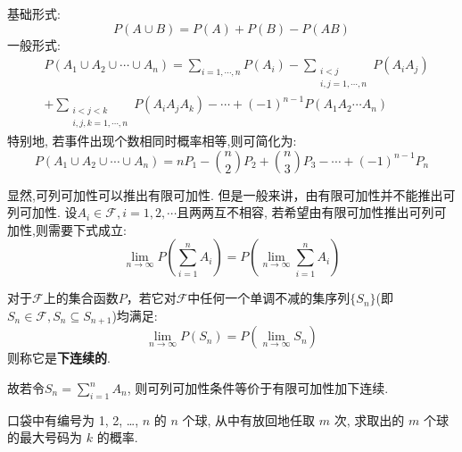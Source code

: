 \begin{corollary}[加法公式]
    基础形式:
    \[ P(A \cup B) = P(A) + P(B) - P(AB) \]
    一般形式:
    \begin{align*}
         & P\left(A_{1} \cup A_{2} \cup \cdots \cup A_{n}\right) =  \sum_{i=1, \cdots, n} P\left(A_{i}\right)-\sum_{\substack{i<j \\
        i, j=1, \cdots, n}} P\left(A_{i} A_{j}\right)                                                                             \\
         & +\sum_{\substack{i<j<k                                                                                                 \\i, j, k=1, \cdots, n}} P\left(A_{i} A_{j} A_{k}\right)-\cdots+(-1)^{n-1} P\left(A_{1} A_{2} \cdots A_{n}\right)
    \end{align*}
    特别地, 若事件出现个数相同时概率相等,则可简化为:
    \[ P\left(A_{1} \cup A_{2} \cup \cdots \cup A_{n}\right)=n P_{1} - \binom{n}{2} P_{2} + \binom{n}{3} P_{3}- \cdots+(-1)^{n-1} P_{n} \]
\end{corollary}

显然,可列可加性可以推出有限可加性. 但是一般来讲，由有限可加性并不能推出可列可加性. 设$A_i \in \mathscr{F}, i=1,2,\cdots $且两两互不相容, 若希望由有限可加性推出可列可加性,则需要下式成立:
\[ \lim_{n \to \infty}P(\sum_{i=1}^n A_i) =P(\lim_{n \to \infty}\sum_{i=1}^{n} A_i) \]

\begin{definition}
    对于$\mathscr{F}$上的集合函数$P$，若它对$\mathscr{F}$中任何一个单调不减的集序列$\{ S_n \}$(即$ S_n \in \mathscr{F}, S_n \subseteq  S_{n+1} $)均满足:
    \[ \lim_{n \to \infty}P(S_n) =P(\lim_{n \to \infty} S_n) \]
    则称它是\textbf{下连续的}.
\end{definition}

故若令$S_n = \sum_{i=1}^n A_n$, 则可列可加性条件等价于有限可加性加下连续.

\begin{example}
    口袋中有编号为 1, 2, \dots, $n$ 的 $n$ 个球,
    从中有放回地任取 $m$ 次,
    求取出的 $m$ 个球的最大号码为 $k$ 的概率.
\end{example}

